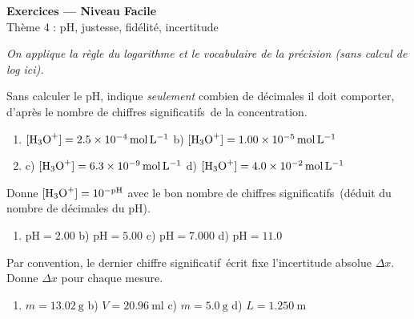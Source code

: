 \documentclass[11pt,a4paper]{article}
\newcommand{\cs}{chiffre significatif}
\newcommand{\CS}{chiffres significatifs}
\begin{document}
\begin{center}
{\Large\bfseries\color{primarydark} Exercices — Niveau Facile}\\[1pt]
{\color{primary} Thème 4 : pH, justesse, fidélité, incertitude}
\end{center}
\vspace{1mm}
\textit{On applique la règle du logarithme et le vocabulaire de la précision (sans calcul de log ici).}
\vspace{2mm}

\begin{exo}
Sans calculer le pH, indique \emph{seulement} combien de décimales il doit comporter, d'après le
nombre de \CS\ de la concentration.
\begin{enumerate}[label=\alph*),leftmargin=1.6em,itemsep=1pt]
  \item $[\ce{H3O+}]=\num{2,5e-4}\,\si{\mol\per\litre}$ \qquad b) $[\ce{H3O+}]=\num{1,00e-5}\,\si{\mol\per\litre}$
  \item[] c) $[\ce{H3O+}]=\num{6,3e-9}\,\si{\mol\per\litre}$ \qquad d) $[\ce{H3O+}]=\num{4,0e-2}\,\si{\mol\per\litre}$
\end{enumerate}
\end{exo}

\begin{exo}
Donne $[\ce{H3O+}]=10^{-\mathrm{pH}}$ avec le bon nombre de \CS\ (déduit du nombre de décimales du pH).
\begin{enumerate}[label=\alph*),leftmargin=1.6em,itemsep=1pt]
  \item $\mathrm{pH}=\num{2,00}$ \qquad b) $\mathrm{pH}=\num{5,00}$ \qquad c) $\mathrm{pH}=\num{7,000}$ \qquad d) $\mathrm{pH}=\num{11,0}$
\end{enumerate}
\end{exo}

\begin{exo}
Par convention, le dernier \cs\ écrit fixe l'incertitude absolue $\Delta x$. Donne $\Delta x$ pour
chaque mesure.
\begin{enumerate}[label=\alph*),leftmargin=1.6em,itemsep=1pt]
  \item $m=\qty{13,02}{\gram}$ \qquad b) $V=\qty{20,96}{\milli\litre}$ \qquad c) $m=\qty{5,0}{\gram}$ \qquad d) $L=\qty{1,250}{\metre}$
\end{enumerate}
\end{exo}
\end{document}
